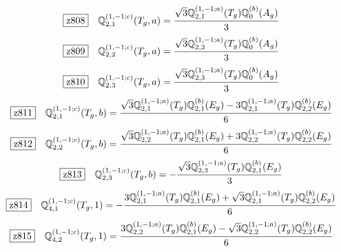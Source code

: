 \documentclass[fleqn,10pt,landscape]{jsarticle}
\begin{document}
\begin{dmath*}
\hspace*{3mm}\fbox{z808}\quad \mathbb{Q}_{2,1}^{(1,-1;c)}(T_{g},a)=\frac{\sqrt{3} \mathbb{Q}_{2,1}^{(1,-1;a)}(T_{g}) \mathbb{Q}_{0}^{(b)}(A_{g})}{3}
\end{dmath*}
\begin{dmath*}
\hspace*{3mm}\fbox{z809}\quad \mathbb{Q}_{2,2}^{(1,-1;c)}(T_{g},a)=\frac{\sqrt{3} \mathbb{Q}_{2,2}^{(1,-1;a)}(T_{g}) \mathbb{Q}_{0}^{(b)}(A_{g})}{3}
\end{dmath*}
\begin{dmath*}
\hspace*{3mm}\fbox{z810}\quad \mathbb{Q}_{2,3}^{(1,-1;c)}(T_{g},a)=\frac{\sqrt{3} \mathbb{Q}_{2,3}^{(1,-1;a)}(T_{g}) \mathbb{Q}_{0}^{(b)}(A_{g})}{3}
\end{dmath*}
\begin{dmath*}
\hspace*{3mm}\fbox{z811}\quad \mathbb{Q}_{2,1}^{(1,-1;c)}(T_{g},b)=\frac{\sqrt{3} \mathbb{Q}_{2,1}^{(1,-1;a)}(T_{g}) \mathbb{Q}_{2,1}^{(b)}(E_{g}) - 3 \mathbb{Q}_{2,1}^{(1,-1;a)}(T_{g}) \mathbb{Q}_{2,2}^{(b)}(E_{g})}{6}
\end{dmath*}
\begin{dmath*}
\hspace*{3mm}\fbox{z812}\quad \mathbb{Q}_{2,2}^{(1,-1;c)}(T_{g},b)=\frac{\sqrt{3} \mathbb{Q}_{2,2}^{(1,-1;a)}(T_{g}) \mathbb{Q}_{2,1}^{(b)}(E_{g}) + 3 \mathbb{Q}_{2,2}^{(1,-1;a)}(T_{g}) \mathbb{Q}_{2,2}^{(b)}(E_{g})}{6}
\end{dmath*}
\begin{dmath*}
\hspace*{3mm}\fbox{z813}\quad \mathbb{Q}_{2,3}^{(1,-1;c)}(T_{g},b)=- \frac{\sqrt{3} \mathbb{Q}_{2,3}^{(1,-1;a)}(T_{g}) \mathbb{Q}_{2,1}^{(b)}(E_{g})}{3}
\end{dmath*}
\begin{dmath*}
\hspace*{3mm}\fbox{z814}\quad \mathbb{Q}_{4,1}^{(1,-1;c)}(T_{g},1)=- \frac{3 \mathbb{Q}_{2,1}^{(1,-1;a)}(T_{g}) \mathbb{Q}_{2,1}^{(b)}(E_{g}) + \sqrt{3} \mathbb{Q}_{2,1}^{(1,-1;a)}(T_{g}) \mathbb{Q}_{2,2}^{(b)}(E_{g})}{6}
\end{dmath*}
\begin{dmath*}
\hspace*{3mm}\fbox{z815}\quad \mathbb{Q}_{4,2}^{(1,-1;c)}(T_{g},1)=\frac{3 \mathbb{Q}_{2,2}^{(1,-1;a)}(T_{g}) \mathbb{Q}_{2,1}^{(b)}(E_{g}) - \sqrt{3} \mathbb{Q}_{2,2}^{(1,-1;a)}(T_{g}) \mathbb{Q}_{2,2}^{(b)}(E_{g})}{6}
\end{dmath*}
\end{document}

